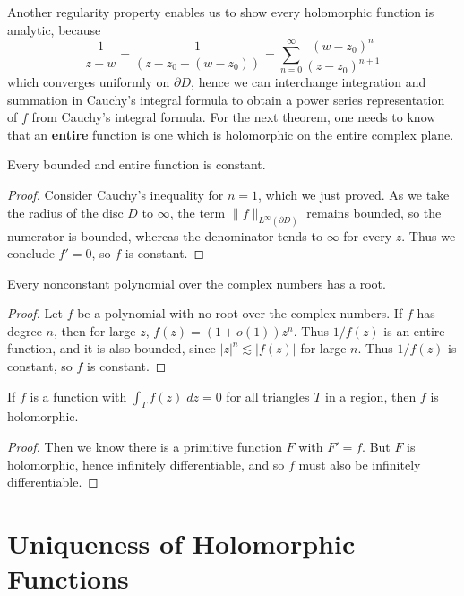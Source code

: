 Another regularity property enables us to show every holomorphic function is analytic, because
%
\[ \frac{1}{z - w} = \frac{1}{(z - z_0 - (w - z_0))} = \sum_{n = 0}^\infty \frac{(w - z_0)^n}{(z - z_0)^{n+1}} \]
%
which converges uniformly on $\partial D$, hence we can interchange integration and summation in Cauchy's integral formula to obtain a power series representation of $f$ from Cauchy's integral formula. For the next theorem, one needs to know that an {\bf entire} function is one which is holomorphic on the entire complex plane.

\begin{theorem}[Louville]
    Every bounded and entire function is constant.
\end{theorem}
\begin{proof}
    Consider Cauchy's inequality for $n = 1$, which we just proved. As we take the radius of the disc $D$ to $\infty$, the term $\| f \|_{L^\infty(\partial D)}$ remains bounded, so the numerator is bounded, whereas the denominator tends to $\infty$ for every $z$. Thus we conclude $f' = 0$, so $f$ is constant.
\end{proof}

\begin{theorem}
    Every nonconstant polynomial over the complex numbers has a root.
\end{theorem}
\begin{proof}
    Let $f$ be a polynomial with no root over the complex numbers. If $f$ has degree $n$, then for large $z$, $f(z) = (1 + o(1))z^n$. Thus $1/f(z)$ is an entire function, and it is also bounded, since $|z|^n \lesssim |f(z)|$ for large $n$. Thus $1/f(z)$ is constant, so $f$ is constant.
\end{proof}

\begin{theorem}[Morera]
    If $f$ is a function with $\int_T f(z)\; dz = 0$ for all triangles $T$ in a region, then $f$ is holomorphic.
\end{theorem}
\begin{proof}
    Then we know there is a primitive function $F$ with $F' = f$. But $F$ is holomorphic, hence infinitely differentiable, and so $f$ must also be infinitely differentiable.
\end{proof}

\section{Uniqueness of Holomorphic Functions}

